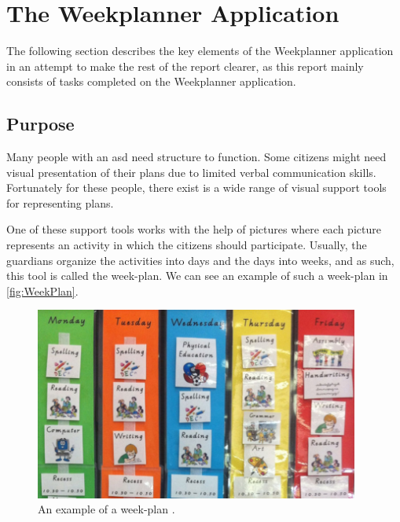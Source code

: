 \section{The Weekplanner Application}\label{sec:TheWeekplannerApplication}

The following section describes the key elements of the Weekplanner application in an attempt to make the rest of the report clearer, as this report mainly consists of tasks completed on the Weekplanner application.

\subsection{Purpose}

Many people with an \gls{asd} need structure to function. Some \glspl{citizen} might need visual presentation\cite{VisualSupport} of their plans due to limited verbal communication skills. Fortunately for these people, there exist is a wide range of visual support tools for representing plans.

One of these support tools works with the help of pictures where each picture represents an activity in which the \glspl{citizen} should participate. Usually, the \glspl{guardian} organize the activities into days and the days into weeks, and as such, this tool is called the week-plan. We can see an example of such a week-plan in \autoref{fig:WeekPlan}.

\begin{figure}[H]
    \begin{center}
        \includegraphics[width=0.95\textwidth]{figures/WeekPlanEks.png}
    \end{center}
    \caption{An example of a week-plan \cite{VisualSupport}.}
    \label{fig:WeekPlan}
\end{figure}

